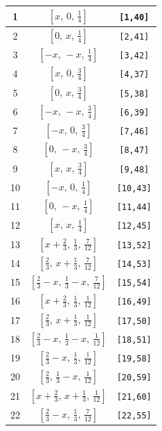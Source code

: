 \documentclass[fleqn,8pt]{jsarticle}
\begin{document}
\begin{longtable}{ccc}
1 & $\left[ x,\, 0,\, \frac{1}{4} \right]$ & {\tt [1,40]} \\ \hline
2 & $\left[ 0,\, x,\, \frac{1}{4} \right]$ & {\tt [2,41]} \\ \hline
3 & $\left[ - x,\, - x,\, \frac{1}{4} \right]$ & {\tt [3,42]} \\ \hline
4 & $\left[ x,\, 0,\, \frac{3}{4} \right]$ & {\tt [4,37]} \\ \hline
5 & $\left[ 0,\, x,\, \frac{3}{4} \right]$ & {\tt [5,38]} \\ \hline
6 & $\left[ - x,\, - x,\, \frac{3}{4} \right]$ & {\tt [6,39]} \\ \hline
7 & $\left[ - x,\, 0,\, \frac{3}{4} \right]$ & {\tt [7,46]} \\ \hline
8 & $\left[ 0,\, - x,\, \frac{3}{4} \right]$ & {\tt [8,47]} \\ \hline
9 & $\left[ x,\, x,\, \frac{3}{4} \right]$ & {\tt [9,48]} \\ \hline
10 & $\left[ - x,\, 0,\, \frac{1}{4} \right]$ & {\tt [10,43]} \\ \hline
11 & $\left[ 0,\, - x,\, \frac{1}{4} \right]$ & {\tt [11,44]} \\ \hline
12 & $\left[ x,\, x,\, \frac{1}{4} \right]$ & {\tt [12,45]} \\ \hline
13 & $\left[ x + \frac{2}{3},\, \frac{1}{3},\, \frac{7}{12} \right]$ & {\tt [13,52]} \\ \hline
14 & $\left[ \frac{2}{3},\, x + \frac{1}{3},\, \frac{7}{12} \right]$ & {\tt [14,53]} \\ \hline
15 & $\left[ \frac{2}{3} - x,\, \frac{1}{3} - x,\, \frac{7}{12} \right]$ & {\tt [15,54]} \\ \hline
16 & $\left[ x + \frac{2}{3},\, \frac{1}{3},\, \frac{1}{12} \right]$ & {\tt [16,49]} \\ \hline
17 & $\left[ \frac{2}{3},\, x + \frac{1}{3},\, \frac{1}{12} \right]$ & {\tt [17,50]} \\ \hline
18 & $\left[ \frac{2}{3} - x,\, \frac{1}{3} - x,\, \frac{1}{12} \right]$ & {\tt [18,51]} \\ \hline
19 & $\left[ \frac{2}{3} - x,\, \frac{1}{3},\, \frac{1}{12} \right]$ & {\tt [19,58]} \\ \hline
20 & $\left[ \frac{2}{3},\, \frac{1}{3} - x,\, \frac{1}{12} \right]$ & {\tt [20,59]} \\ \hline
21 & $\left[ x + \frac{2}{3},\, x + \frac{1}{3},\, \frac{1}{12} \right]$ & {\tt [21,60]} \\ \hline
22 & $\left[ \frac{2}{3} - x,\, \frac{1}{3},\, \frac{7}{12} \right]$ & {\tt [22,55]} \\ \hline

\end{longtable}
\end{document}
